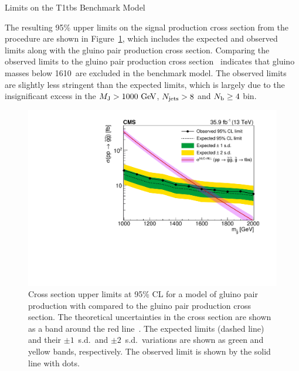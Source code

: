 \begin{section}{Limits on the T1tbs Benchmark Model}

The resulting 95\% upper limits on the signal production cross section from the \CLs procedure are shown in Figure~\ref{fig:limits}, which includes the expected and observed limits along with the gluino pair production cross section.
Comparing the observed limits to the gluino pair production cross section~\cite{XSecgluinogluino} indicates that gluino masses below 1610~\GeV are excluded in the benchmark \smsDecay model.
The observed limits are slightly less stringent than the expected limits, which is largely due to the insignificant excess in the $M_{\mathrm{J}} > 1000~\mathrm{Ge\kern -0.1em V}$, $N_{\mathrm{jets}} > 8$ and $N_{\mathrm{b}} \geq 4$ bin.

\begin{figure}[tbp!]
\centering
\includegraphics[angle=0,width=0.80\columnwidth]{fig/limits.pdf}
\caption{Cross section upper limits at 95\% CL for a model of gluino pair production with \smsDecay compared to the gluino pair production cross section.
The theoretical uncertainties in the cross section are shown as a band around the
red line~\cite{XSecgluinogluino}.
The expected limits (dashed line) and their $\pm1$~s.d.\ and $\pm2$~s.d.\ variations are shown as green and yellow bands, respectively.
The observed limit is shown by the solid line with dots.}
\label{fig:limits}
\end{figure}

\end{section}
